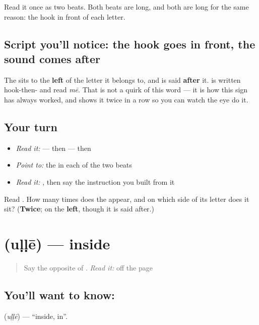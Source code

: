 Read it once as two beats. Both beats are long, and both are long for the same reason: the \textbf{} hook in front of each letter.

\subsection*{Script you'll notice: the hook goes in front, the sound comes after}
The \textbf{} sits to the \textbf{left} of the letter it belongs to, and is said \textbf{after} it. \textbf{} is written hook-then-\textbf{} and read \emph{mē}. That is not a quirk of this word — it is how this sign has always worked, and \textbf{} shows it twice in a row so you can watch the eye do it.

\subsection*{Your turn}
\begin{itemize}
\raggedright
  \item \emph{Read it:} \textbf{} — then \textbf{} — then \textbf{}
  \item \emph{Point to:} the \textbf{} in each of the two beats
  \item \emph{Read it:} \textbf{}, then say the instruction you built from it
\end{itemize}

\begin{tcolorbox}[breakable,colback=teal!4,colframe=teal!35!black,title={Before you move on}]
Read \textbf{}. How many times does the \textbf{} appear, and on which side of its letter does it sit? (\textbf{Twice}; on the \textbf{left}, though it is said after.)
\end{tcolorbox}
\section[\texorpdfstring{\ta{உள்ளே} (uḷḷē)}{உள்ளே (uḷḷē)}]{ (uḷḷē) — inside}

\label{lesson:TA-C66-inside}



\begin{quote}
Say the opposite of \textbf{}. \emph{Read it:} \textbf{} off the page
\end{quote}

\subsection*{You'll want to know: }
\textbf{} (\emph{uḷḷē}) — \textquotedblleft{}inside, in\textquotedblright{}.

